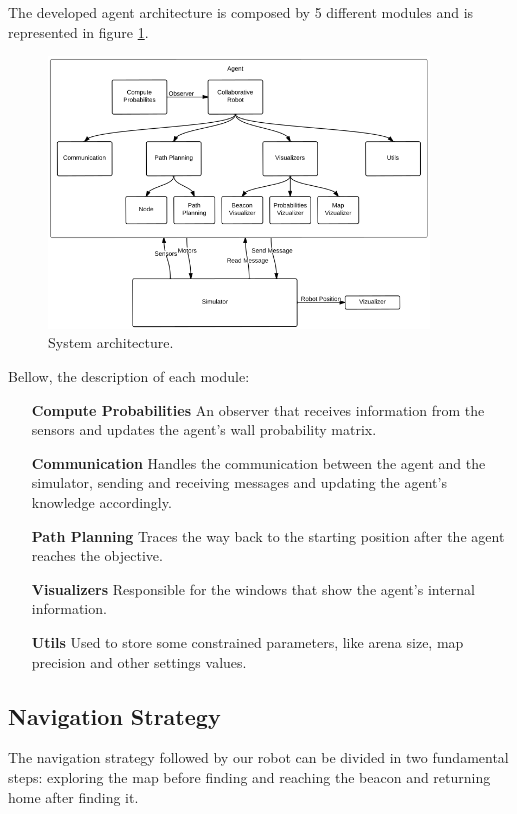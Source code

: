 \documentclass[oribibl]{llncs}
\begin{document}
The developed agent architecture is composed by 5 different modules and is represented in figure \ref{fig:robot-arch}.

\begin{figure}
  \centering
  \includegraphics[width=0.9\textwidth]{robot-architecture.png}
  \caption{System architecture.}
  \label{fig:robot-arch}
\end{figure}

Bellow, the description of each module:

\begin{itemize}
  \item[\textbf{Compute Probabilities}]
  An observer that receives information from the sensors and updates the agent's
wall probability matrix.
  \item[\textbf{Communication}]
  Handles the communication between the agent and the simulator, sending and receiving messages and updating the agent's knowledge accordingly. 
  \item[\textbf{Path Planning}]
  Traces the way back to the starting position after the agent reaches the objective.
  \item[\textbf{Visualizers}]
  Responsible for the windows that show the agent's internal information.
  \item[\textbf{Utils}]
  Used to store some constrained parameters, like arena size, map precision and other settings values.
\end{itemize}

\subsection{Navigation Strategy}
The navigation strategy followed by our robot can be divided in two fundamental steps: exploring the map before finding and reaching the beacon and returning home after finding it.
\end{document}
